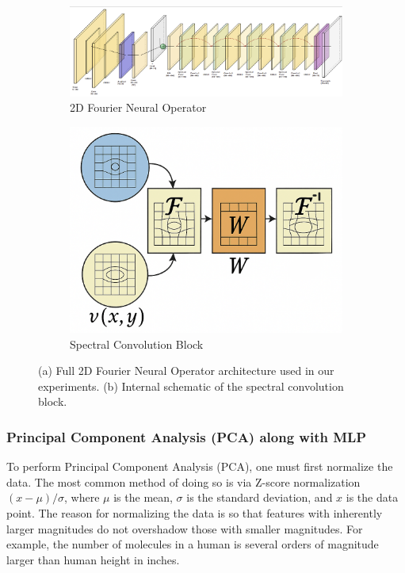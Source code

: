 \documentclass{article}
\begin{document}
\begin{figure}
    \centering
    \begin{subfigure}[b]{0.6\linewidth}
        \centering
        \includegraphics[width=\linewidth]{figures/FNO2D.png}
        \caption{2D Fourier Neural Operator}
    \end{subfigure}
    \hfill
    \begin{subfigure}[b]{0.3\linewidth}
        \centering
        \includegraphics[width=\linewidth]{figures/spectralconv2d.png}
        \caption{Spectral Convolution Block}
    \end{subfigure}
    \caption{(a) Full 2D Fourier Neural Operator architecture used in our experiments. (b) Internal schematic of the spectral convolution block.}
    \label{fig:fno-2d}
\end{figure}

\subsubsection{Principal Component Analysis (PCA) along with MLP} 

To perform Principal Component Analysis (PCA), one must first normalize the data. The most common method of doing so is via Z-score normalization $(x - \mu)/\sigma$, where $\mu$ is the mean, $\sigma$ is the standard deviation, and $x$ is the data point. The reason for normalizing the data is so that features with inherently larger magnitudes do not overshadow those with smaller magnitudes. For example, the number of molecules in a human is several orders of magnitude larger than human height in inches.
\end{document}
